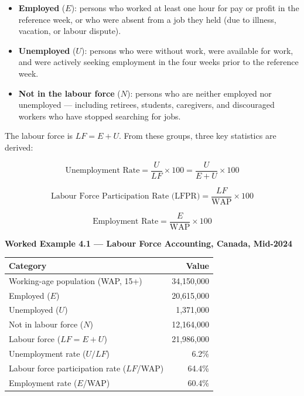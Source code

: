 \begin{itemize}
  \item \textbf{Employed} ($E$): persons who worked at least one hour
        for pay or profit in the reference week, or who were absent from
        a job they held (due to illness, vacation, or labour dispute).
  \item \textbf{Unemployed} ($U$): persons who were without work, were
        available for work, and were actively seeking employment in the
        four weeks prior to the reference week.
  \item \textbf{Not in the labour force} ($N$): persons who are neither
        employed nor unemployed --- including retirees, students, caregivers,
        and discouraged workers who have stopped searching for jobs.
\end{itemize}

The labour force is $LF = E + U$. From these groups, three key statistics
are derived:

\begin{equation}
  \text{Unemployment Rate} = \frac{U}{LF} \times 100 = \frac{U}{E + U} \times 100
  \label{eq:unemployment_rate}
\end{equation}

\begin{equation}
  \text{Labour Force Participation Rate (LFPR)} = \frac{LF}{\text{WAP}} \times 100
  \label{eq:lfpr}
\end{equation}

\begin{equation}
  \text{Employment Rate} = \frac{E}{\text{WAP}} \times 100
  \label{eq:employment_rate}
\end{equation}

\noindent\textbf{Worked Example 4.1 --- Labour Force Accounting, Canada, Mid-2024}

\begin{center}
\renewcommand{\arraystretch}{1.35}
\begin{tabular}{lr}
\toprule
\textbf{Category} & \textbf{Value} \\
\midrule
Working-age population (WAP, 15+)             & 34{,}150{,}000 \\
Employed ($E$)                                & 20{,}615{,}000 \\
Unemployed ($U$)                              &  1{,}371{,}000 \\
Not in labour force ($N$)                     & 12{,}164{,}000 \\
\midrule
Labour force ($LF = E + U$)                   & 21{,}986{,}000 \\
\midrule
Unemployment rate ($U/LF$)                    & 6.2\% \\
Labour force participation rate ($LF$/WAP)    & 64.4\% \\
Employment rate ($E$/WAP)                     & 60.4\% \\
\bottomrule
\end{tabular}
\end{center}

